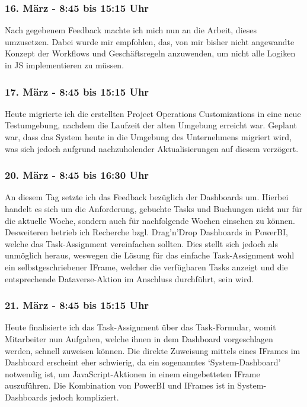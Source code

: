 \subsubsection*{16. März - 8:45 bis 15:15 Uhr} 
Nach gegebenem Feedback machte ich mich nun an die Arbeit, dieses umzusetzen. Dabei wurde mir empfohlen, das, von mir bisher nicht angewandte Konzept der Workflows und Geschäftsregeln anzuwenden, um nicht alle Logiken in JS implementieren zu müssen.

\subsubsection*{17. März - 8:45 bis 15:15 Uhr}
Heute migrierte ich die erstellten Project Operations Customizations in eine neue Testumgebung, nachdem die Laufzeit der alten Umgebung erreicht war. Geplant war, dass das System heute in die Umgebung des Unternehmens migriert wird, was sich jedoch aufgrund nachzuholender Aktualisierungen auf diesem verzögert.

\subsubsection*{20. März - 8:45 bis 16:30 Uhr}
An diesem Tag setzte ich das Feedback bezüglich der Dashboards um. Hierbei handelt es sich um die Anforderung, gebuchte Tasks und Buchungen nicht nur für die aktuelle Woche, sondern auch für nachfolgende Wochen einsehen zu können. Desweiteren betrieb ich Recherche bzgl. Drag'n'Drop Dashboards in PowerBI, welche das Task-Assignment vereinfachen sollten. Dies stellt sich jedoch als unmöglich heraus, weswegen die Lösung für das einfache Task-Assignment wohl ein selbstgeschriebener IFrame, welcher die verfügbaren Tasks anzeigt und die entsprechende Dataverse-Aktion im Anschluss durchführt, sein wird.

\subsubsection*{21. März - 8:45 bis 15:15 Uhr}
Heute finalisierte ich das Task-Assignment über das Task-Formular, womit Mitarbeiter nun Aufgaben, welche ihnen in dem Dashboard vorgeschlagen werden, schnell zuweisen können. Die direkte Zuweisung mittels eines IFrames im Dashboard erscheint eher schwierig, da ein sogenanntes \enquote*{System-Dashboard} notwendig ist, um JavaScript-Aktionen in einem eingebetteten IFrame auszuführen. Die Kombination von PowerBI und IFrames ist in System-Dashboards jedoch kompliziert.

